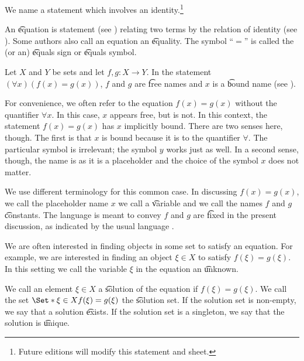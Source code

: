 

We name a statement which involves an identity.\footnote{Future editions will modify this statement and sheet.}


An \t{equation} is statement (see ) relating two terms by the relation of identity (see ).
Some authors also call an equation an \t{equality}.
The symbol ``$=$'' is called the (or an) \t{equals sign} or \t{equals symbol}.


Let $X$ and $Y$ be sets and let $f,g: X \to Y$.
In the statement $(\forall x)(f(x) = g(x))$, $f$ and $g$ are \t{free} names and $x$ is a \t{bound} name (see ).

For convenience, we often refer to the equation $f(x) = g(x)$ without the quantifier $\forall x$.
In this case, $x$ appears free, but is not.
In this context, the statement $f(x) = g(x)$ has $x$ implicitly bound.
There are two senses here, though.
The first is that $x$ is bound because it is  to the quantifier $\forall$.
The particular symbol is irrelevant; the symbol $y$ works just as well.
In a second sense, though, the name is  as it is a placeholder and the choice of the symbol $x$ does not matter.

We use different terminology for this common case.
In discussing $f(x) = g(x)$, we call the placeholder name $x$ we call a \t{variable} and we call the names $f$ and $g$ \t{constants}.
The language is meant to convey $f$ and $g$ are \t{fixed} in the present discussion, as indicated by the usual language .


We are often interested in finding objects in some set to satisfy an equation.
For example, we are interested in finding an object $\xi \in X$ to satisfy $f(\xi) = g(\xi)$.
In this setting we call the variable $\xi$ in the equation an \t{unknown}.

We call an element $\xi \in X$ a \t{solution} of the equation if $f(\xi) = g(\xi)$.
We call the set $\Set*{\xi \in X}{f(\xi) = g(\xi)}$ the \t{solution set}.
If the solution set is non-empty, we say that a solution \t{exists}.
If the solution set is a singleton, we say that the solution is \t{unique}.

